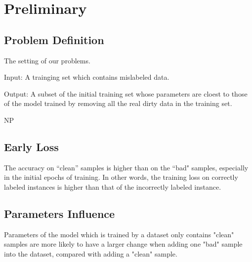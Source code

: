 \section{Preliminary} 
\label{sec:pre}

\subsection{Problem Definition}


The setting of our problems.

Input: A trainging set which contains mislabeled data.

Output: A subset of the initial training set whose parameters are cloest to those of the model trained by removing all the real dirty data in the training set.

 NP

\subsection{Early Loss}

The accuracy on “clean” samples is higher than on the “bad" samples, especially in the initial epochs of training. In other words, the training loss on correctly labeled instances is higher than that of the incorrectly labeled instance.

\subsection{Parameters Influence}

Parameters of the model which is trained by a dataset only contains "clean" samples are more likely to have a larger change when adding one "bad" sample into the dataset, compared with adding a "clean" sample.